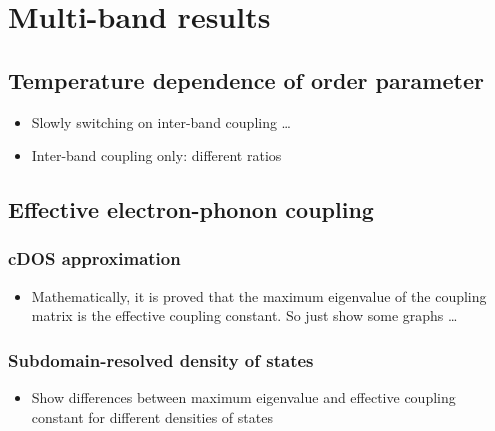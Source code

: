 
\chapter{Multi-band results}

\section{Temperature dependence of order parameter}

\begin{itemize}
    \item Slowly switching on inter-band coupling \dots
    \item Inter-band coupling only: different ratios
\end{itemize}

\section{Effective electron-phonon coupling}

\subsection{cDOS approximation}

\begin{itemize}
    \item Mathematically, it is proved that the maximum eigenvalue of the
          coupling matrix is the effective coupling constant. So just show some
          graphs \dots
\end{itemize}

\subsection{Subdomain-resolved density of states}

\begin{itemize}
    \item Show differences between maximum eigenvalue and effective coupling
          constant for different densities of states
\end{itemize}
